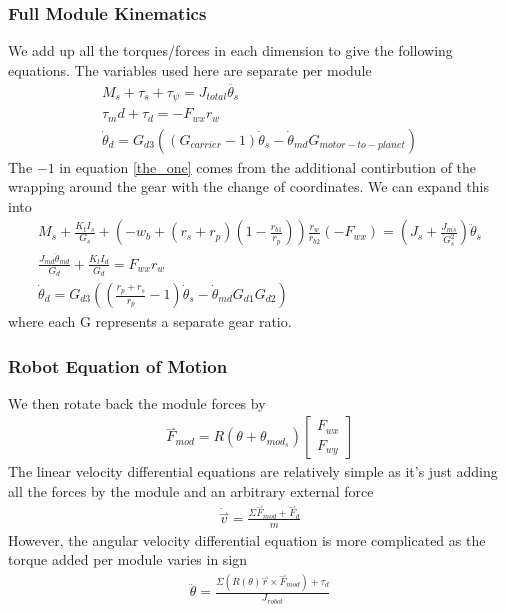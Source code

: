 \documentclass{article}
\newcommand{\harpoon}{\overset{\rightharpoonup}}
\begin{document}
\subsubsection{Full Module Kinematics}
We add up all the torques/forces in each dimension to give the following equations. The variables used here are separate per module
\begin{gather}
    M_s + \tau_s + \tau_\psi = J_{total}\ddot{\theta_s}\\
    \tau_md + \tau_d = -F_{wx}r_w\\
    \dot\theta_d = G_{d3}\left(\left(G_{carrier} - 1\right)\dot\theta_s - \dot\theta_{md}G_{motor-to-planet}\right) \label{the_one}
\end{gather}
The $-1$ in equation \eqref{the_one} comes from the additional contirbution of the wrapping around the gear with the change of coordinates.
We can expand this into
\begin{gather}
    M_s + \frac{K_tI_s}{G_s} + \left(-w_b+\left(r_s+r_p\right)\left(1-\frac{r_{b1}}{r_p}\right)\right)\frac{r_w}{r_{b2}}\left(-F_{wx}\right) = \left(J_s + \frac{J_{ms}}{G^2_s}\right)\ddot\theta_s\\
    \frac{J_{md}\ddot\theta_{md}}{G_d}+\frac{K_{t}I_d}{G_d} = F_{wx}r_w \label{md_ddot}\\
    \dot\theta_d = G_{d3}\left(\left(\frac{r_p+r_s}{r_p}-1\right)\dot\theta_s - \dot\theta_{md}G_{d1}G_{d2}\right)
\end{gather}
where each G represents a separate gear ratio.
\subsubsection{Robot Equation of Motion}
We then rotate back the module forces by
\begin{gather}
    \harpoon{F}_{mod} = R(\theta + \theta_{mod_s})\begin{bmatrix}
        F_{wx} \\
        F_{wy}
    \end{bmatrix}
\end{gather}
The linear velocity differential equations are relatively simple as it's just adding all the forces by the module and an arbitrary external force
\begin{gather}
    \dot{\harpoon{v}} = \frac{\Sigma \harpoon{F}_{mod} + \harpoon{F}_{d}}{m}
\end{gather}
However, the angular velocity differential equation is more complicated as the torque added per module varies in sign
\begin{gather}
    \ddot{\theta} = \frac{\Sigma\left(R\left(\theta\right)\harpoon{r} \times \harpoon{F}_{mod}\right) + \tau_{d}}{J_{robot}}
\end{gather}
\end{document}
